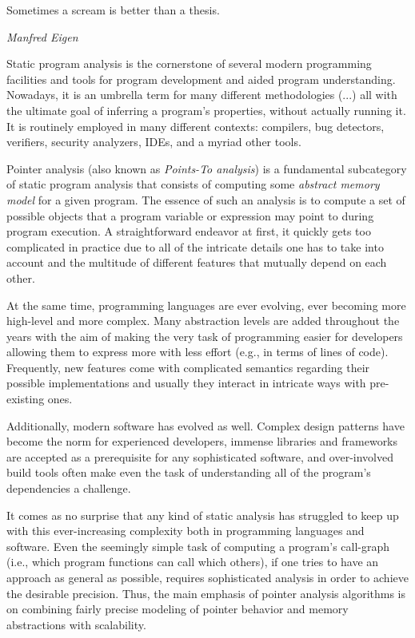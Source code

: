 \label{chapter:intro}

\epigraph{Sometimes a scream is better than a thesis.}{\textit{Manfred Eigen}}

Static program analysis is the cornerstone of several modern programming facilities and tools for program development and aided program understanding. Nowadays, it is an umbrella term for many different methodologies (...) all with the ultimate goal of inferring a program's properties, without actually running it. It is routinely employed in many different contexts: compilers, bug detectors, verifiers, security analyzers, IDEs, and a myriad other tools.

Pointer analysis (also known as \emph{Points-To analysis}) is a fundamental subcategory of static program analysis that consists of computing some \emph{abstract memory model} for a given program. The essence of such an analysis is to compute a set of possible objects that a program variable or expression may point to during program execution. A straightforward endeavor at first, it quickly gets too complicated in practice due to all of the intricate details one has to take into account and the multitude of different features that mutually depend on each other.

At the same time, programming languages are ever evolving, ever becoming more high-level and more complex. Many abstraction levels are added throughout the years with the aim of making the very task of programming easier for developers allowing them to express more with less effort (e.g., in terms of lines of code). Frequently, new features come with complicated semantics regarding their possible implementations and usually they interact in intricate ways with pre-existing ones.

Additionally, modern software has evolved as well. Complex design patterns have become the norm for experienced developers, immense libraries and frameworks are accepted as a prerequisite for any sophisticated software, and over-involved build tools often make even the task of understanding all of the program's dependencies a challenge.

It comes as no surprise that any kind of static analysis has struggled to keep up with this ever-increasing complexity both in programming languages and software. Even the seemingly simple task of computing a program's call-graph (i.e., which program functions can call which others), if one tries to have an approach as general as possible, requires sophisticated analysis in order to achieve the desirable precision. Thus, the main emphasis of pointer analysis algorithms is on combining fairly precise modeling of pointer behavior and memory abstractions with scalability.

